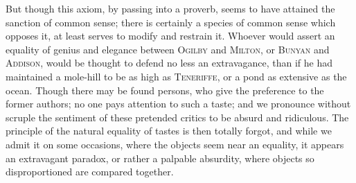But though this axiom, by passing into a proverb, seems to have
attained the sanction of common sense; there is certainly a species of
common sense which opposes it, at least serves to modify and restrain
it. Whoever would assert an equality of genius and elegance between
\textsc{Ogilby} and \textsc{Milton}, or \textsc{Bunyan} and
\textsc{Addison}, would be thought to defend no less an extravagance,
than if he had maintained a mole-hill to be as high as
\textsc{Teneriffe}, or a pond as extensive as the ocean. Though there
may be found persons, who give the preference to the former authors;
no one pays attention to such a taste; and we pronounce without
scruple the sentiment of these pretended critics to be absurd and
ridiculous. The principle of the natural equality of tastes is then
totally forgot, and while we admit it on some occasions, where the
objects seem near an equality, it appears an extravagant paradox, or
rather a palpable absurdity, where objects so disproportioned are
compared together.

